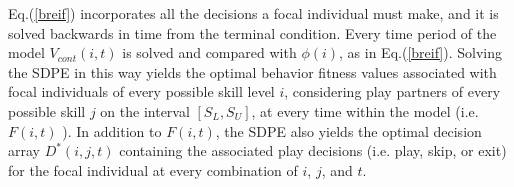 \documentclass[12pt,letterpaper]{article}
\begin{document}
      Eq.(\ref{breif}) incorporates all the decisions a focal individual must make, and it is solved backwards in time from the terminal condition.
      Every time period of the model $V_{cont}(i,t)$ is solved and compared with $\phi(i)$, as in Eq.(\ref{breif}).
      Solving the SDPE in this way yields the optimal behavior fitness values associated with focal individuals of every possible skill level $i$, considering play partners of every possible skill $j$ on the interval $[S_L,S_U]$, at every time within the model (i.e. $F(i,t)$ ).
      In addition to $F(i,t)$, the SDPE also yields the optimal decision array $D^*(i,j,t)$ containing the associated play decisions (i.e. play, skip, or exit) for the focal individual at every combination of $i$, $j$, and $t$.  



      
\end{document}
